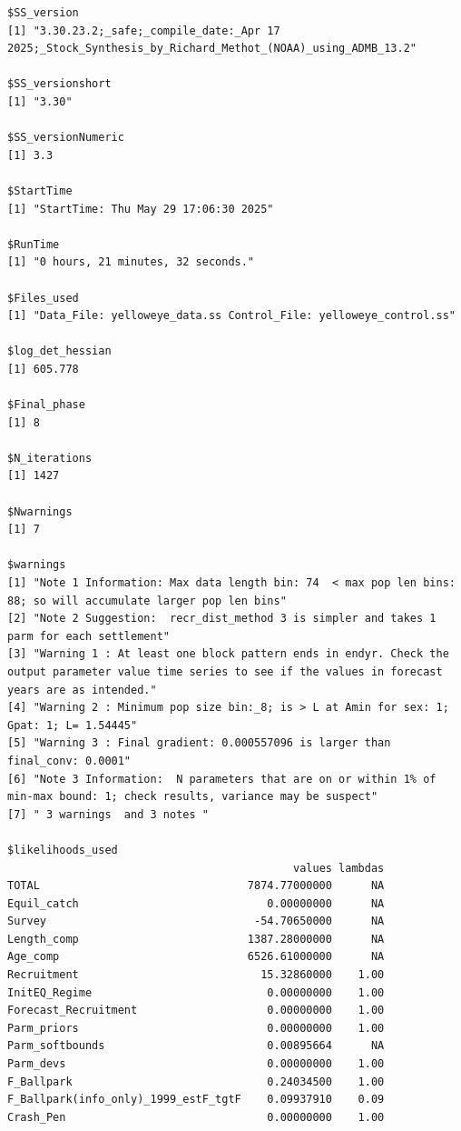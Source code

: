 \documentclass[
]{scrartcl}
\begin{document}
\newpage{}

\begin{verbatim}
$SS_version
[1] "3.30.23.2;_safe;_compile_date:_Apr 17 2025;_Stock_Synthesis_by_Richard_Methot_(NOAA)_using_ADMB_13.2"

$SS_versionshort
[1] "3.30"

$SS_versionNumeric
[1] 3.3

$StartTime
[1] "StartTime: Thu May 29 17:06:30 2025"

$RunTime
[1] "0 hours, 21 minutes, 32 seconds."

$Files_used
[1] "Data_File: yelloweye_data.ss Control_File: yelloweye_control.ss"

$log_det_hessian
[1] 605.778

$Final_phase
[1] 8

$N_iterations
[1] 1427

$Nwarnings
[1] 7

$warnings
[1] "Note 1 Information: Max data length bin: 74  < max pop len bins: 88; so will accumulate larger pop len bins"                                               
[2] "Note 2 Suggestion:  recr_dist_method 3 is simpler and takes 1 parm for each settlement"                                                                    
[3] "Warning 1 : At least one block pattern ends in endyr. Check the output parameter value time series to see if the values in forecast years are as intended."
[4] "Warning 2 : Minimum pop size bin:_8; is > L at Amin for sex: 1; Gpat: 1; L= 1.54445"                                                                       
[5] "Warning 3 : Final gradient: 0.000557096 is larger than final_conv: 0.0001"                                                                                 
[6] "Note 3 Information:  N parameters that are on or within 1% of min-max bound: 1; check results, variance may be suspect"                                    
[7] " 3 warnings  and 3 notes "                                                                                                                                 

$likelihoods_used
                                            values lambdas
TOTAL                                7874.77000000      NA
Equil_catch                             0.00000000      NA
Survey                                -54.70650000      NA
Length_comp                          1387.28000000      NA
Age_comp                             6526.61000000      NA
Recruitment                            15.32860000    1.00
InitEQ_Regime                           0.00000000    1.00
Forecast_Recruitment                    0.00000000    1.00
Parm_priors                             0.00000000    1.00
Parm_softbounds                         0.00895664      NA
Parm_devs                               0.00000000    1.00
F_Ballpark                              0.24034500    1.00
F_Ballpark(info_only)_1999_estF_tgtF    0.09937910    0.09
Crash_Pen                               0.00000000    1.00


\end{verbatim}
\end{document}
